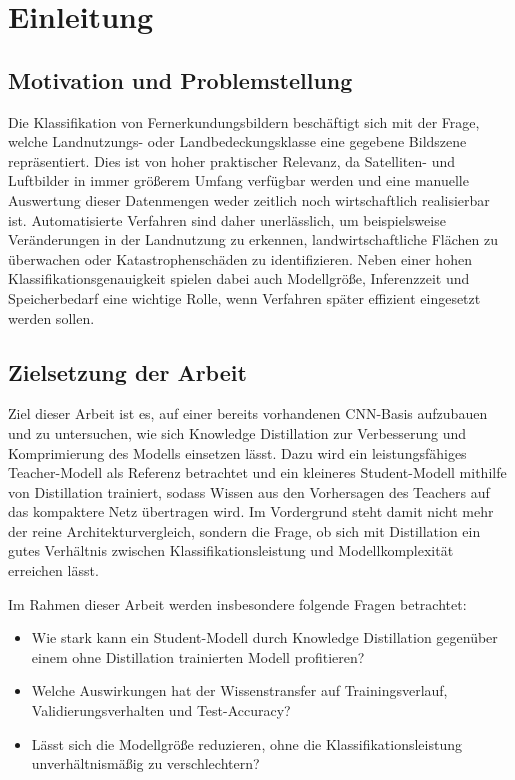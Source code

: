 \section{Einleitung}
\label{sec:einleitung}

\subsection{Motivation und Problemstellung}
\label{subsec:motivation}

Die Klassifikation von Fernerkundungsbildern beschäftigt sich mit der Frage, welche Landnutzungs- oder Landbedeckungsklasse eine gegebene Bildszene repräsentiert.
Dies ist von hoher praktischer Relevanz, da Satelliten- und Luftbilder in immer größerem Umfang verfügbar werden und eine manuelle Auswertung dieser Datenmengen weder zeitlich noch wirtschaftlich realisierbar ist.
Automatisierte Verfahren sind daher unerlässlich, um beispielsweise Veränderungen in der Landnutzung zu erkennen, landwirtschaftliche Flächen zu überwachen oder Katastrophenschäden zu identifizieren.
Neben einer hohen Klassifikationsgenauigkeit spielen dabei auch Modellgröße, Inferenzzeit und Speicherbedarf eine wichtige Rolle, wenn Verfahren später effizient eingesetzt werden sollen.

\subsection{Zielsetzung der Arbeit}
\label{subsec:zielsetzung}

Ziel dieser Arbeit ist es, auf einer bereits vorhandenen CNN-Basis aufzubauen und zu untersuchen, wie sich Knowledge Distillation zur Verbesserung und Komprimierung des Modells einsetzen lässt.
Dazu wird ein leistungsfähiges Teacher-Modell als Referenz betrachtet und ein kleineres Student-Modell mithilfe von Distillation trainiert, sodass Wissen aus den Vorhersagen des Teachers auf das kompaktere Netz übertragen wird.
Im Vordergrund steht damit nicht mehr der reine Architekturvergleich, sondern die Frage, ob sich mit Distillation ein gutes Verhältnis zwischen Klassifikationsleistung und Modellkomplexität erreichen lässt.

Im Rahmen dieser Arbeit werden insbesondere folgende Fragen betrachtet:
\begin{itemize}
	\item Wie stark kann ein Student-Modell durch Knowledge Distillation gegenüber einem ohne Distillation trainierten Modell profitieren?
	\item Welche Auswirkungen hat der Wissenstransfer auf Trainingsverlauf, Validierungsverhalten und Test-Accuracy?
	\item Lässt sich die Modellgröße reduzieren, ohne die Klassifikationsleistung unverhältnismäßig zu verschlechtern?
\end{itemize}

